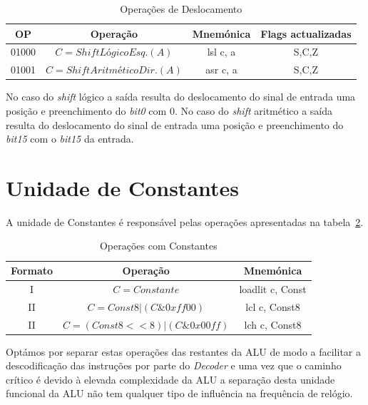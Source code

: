 \begin{table}[h]
	\centering
	\begin{tabular}{|c|c|c|c|}
		\hline
		OP    & Operação & Mnemónica & Flags actualizadas \\ \hline
		01000 & \mbox{$C=Shift Lógico Esq.(A)$}    & lsl c, a   & S,C,Z   \\ \hline
		01001 & \mbox{$C=Shift Aritmético Dir.(A)$}  & asr c, a & S,C,Z   \\ \hline
	\end{tabular}
	\caption{Operações de Deslocamento}
	\label{tabela:shift}
\end{table}

No caso do \textit{shift} lógico a saída resulta do deslocamento do sinal de entrada uma posição e preenchimento do \textit{bit0} com 0. No caso do \textit{shift} aritmético a saída resulta do deslocamento do sinal de entrada uma posição e preenchimento do \textit{bit15} com o \textit{bit15} da entrada.\\

\section{Unidade de Constantes}
A unidade de Constantes é responsável pelas operações apresentadas na tabela~\ref{tabela:constantes}.
\begin{table}[h]
	\centering
	\begin{tabular}{|c|c|c|}
		\hline
		Formato & Operação & Mnemónica \\ \hline
		I & \mbox{$C=Constante$} & loadlit c, Const  \\ \hline
		II & \mbox{$C=Const8|(C\&0xff00)$}  & lcl c, Const8 \\ \hline
		II & \mbox{$C=(Const8<<8)|(C\&0x00ff)$}  & lch c, Const8 \\ \hline
	\end{tabular}
	\caption{Operações com Constantes}
	\label{tabela:constantes}
\end{table}

Optámos por separar estas operações das restantes da ALU de modo a facilitar a descodificação das instruções por parte do \textit{Decoder} e uma vez que o caminho crítico é devido à elevada complexidade da ALU a separação desta unidade funcional da ALU não tem qualquer tipo de influência na frequência de relógio.

